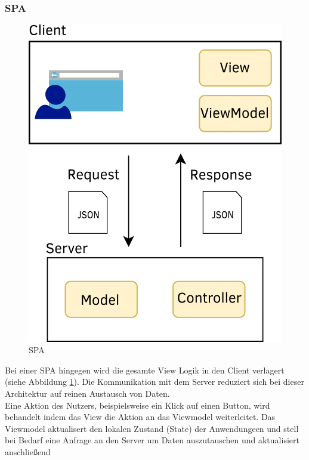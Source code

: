 \subsubsection{\acl{SPA}}
\begin{figure}
  \begin{center}
    \includegraphics[scale=1.5]{images/spa_web_app.png}
  \end{center}
  \caption{\acl{SPA}}
  \label{fig:spaweb}
\end{figure}
Bei einer \ac{SPA} hingegen wird die gesamte View Logik in den Client verlagert
(siehe Abbildung \ref{fig:spaweb}). Die Kommunikation mit dem Server reduziert
sich bei dieser Architektur auf reinen Austausch von Daten.\\
Eine Aktion des Nutzers, beispielsweise ein Klick auf einen Button, wird behandelt indem das
View die Aktion an das Viewmodel weiterleitet. Das Viewmodel aktualisert den
lokalen Zustand (State) der Anwendungeen und stell bei Bedarf eine Anfrage an den Server um Daten auszutauschen und aktualisiert anschließend
